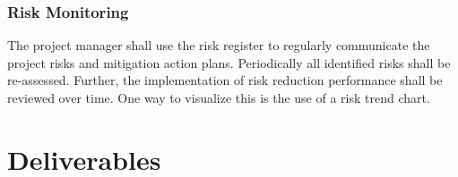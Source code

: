 \subsubsection{Risk Monitoring}

The project manager shall use the risk register to regularly communicate the project risks and mitigation action plans. Periodically all identified risks shall be re-assessed. Further, the implementation of risk reduction performance shall be reviewed over time. One way to visualize this is the use of a risk trend chart. 
  
\clearpage
\section{Deliverables}
\label{sec:Project Management Deliverables}

